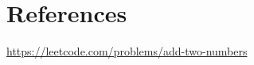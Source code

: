 
\section*{References}

    \begin{enumerate}[label={[\arabic*]}, ref=\arabic*]
        \item{\href{https://leetcode.com/problems/add-two-numbers}{https://leetcode.com/problems/add-two-numbers}}
    \end{enumerate}
